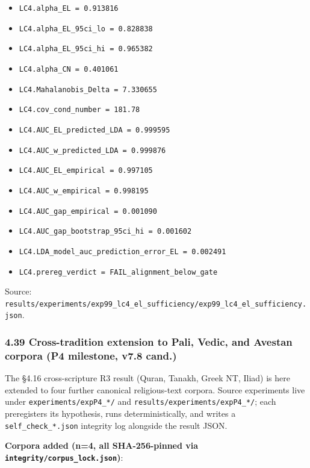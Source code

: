 \documentclass[
]{article}
\providecommand{\tightlist}{%
  \setlength{\itemsep}{0pt}\setlength{\parskip}{0pt}}
\begin{document}
\begin{itemize}
\tightlist
\item
  \texttt{LC4.alpha\_EL\ =\ 0.913816}
\item
  \texttt{LC4.alpha\_EL\_95ci\_lo\ =\ 0.828838}
\item
  \texttt{LC4.alpha\_EL\_95ci\_hi\ =\ 0.965382}
\item
  \texttt{LC4.alpha\_CN\ =\ 0.401061}
\item
  \texttt{LC4.Mahalanobis\_Delta\ =\ 7.330655}
\item
  \texttt{LC4.cov\_cond\_number\ =\ 181.78}
\item
  \texttt{LC4.AUC\_EL\_predicted\_LDA\ =\ 0.999595}
\item
  \texttt{LC4.AUC\_w\_predicted\_LDA\ =\ 0.999876}
\item
  \texttt{LC4.AUC\_EL\_empirical\ =\ 0.997105}
\item
  \texttt{LC4.AUC\_w\_empirical\ =\ 0.998195}
\item
  \texttt{LC4.AUC\_gap\_empirical\ =\ 0.001090}
\item
  \texttt{LC4.AUC\_gap\_bootstrap\_95ci\_hi\ =\ 0.001602}
\item
  \texttt{LC4.LDA\_model\_auc\_prediction\_error\_EL\ =\ 0.002491}
\item
  \texttt{LC4.prereg\_verdict\ =\ FAIL\_alignment\_below\_gate}
\end{itemize}

Source:
\texttt{results/experiments/exp99\_lc4\_el\_sufficiency/exp99\_lc4\_el\_sufficiency.json}.

\subsubsection{4.39 Cross-tradition extension to Pali, Vedic, and
Avestan corpora (P4 milestone, v7.8
cand.)}\label{cross-tradition-extension-to-pali-vedic-and-avestan-corpora-p4-milestone-v7.8-cand.}

The §4.16 cross-scripture R3 result (Quran, Tanakh, Greek NT, Iliad) is
here extended to four further canonical religious-text corpora. Source
experiments live under \texttt{experiments/expP4\_*/} and
\texttt{results/experiments/expP4\_*/}; each preregisters its
hypothesis, runs deterministically, and writes a
\texttt{self\_check\_*.json} integrity log alongside the result JSON.

\textbf{Corpora added (n=4, all SHA-256-pinned via
\texttt{integrity/corpus\_lock.json})}:
\end{document}
